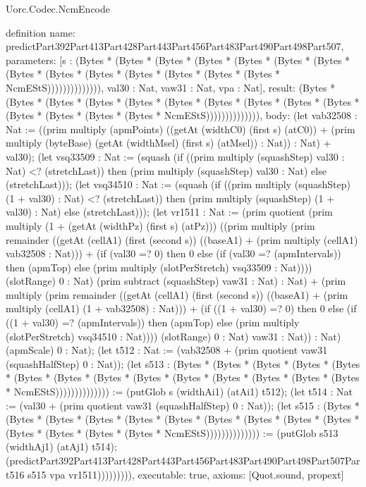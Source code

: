 \begin{lexlean}{Uorc.Codec.NcmEncode}
\begin{semanticmodule}
definition{
  name: predictPart392Part413Part428Part443Part456Part483Part490Part498Part507,
  parameters: [s : (Bytes * (Bytes * (Bytes * (Bytes * (Bytes * (Bytes * (Bytes * (Bytes * (Bytes * (Bytes * (Bytes * (Bytes * (Bytes * (Bytes * NcmEStS)))))))))))))), val30 : Nat, vaw31 : Nat, vpa : Nat],
  result: (Bytes * (Bytes * (Bytes * (Bytes * (Bytes * (Bytes * (Bytes * (Bytes * (Bytes * (Bytes * (Bytes * (Bytes * (Bytes * (Bytes * NcmEStS)))))))))))))),
  body: (let vab32508 : Nat := ((prim multiply (apmPoints) ((getAt (widthC0) (first s) (atC0)) + (prim multiply (byteBase) (getAt (widthMsel) (first s) (atMsel)) : Nat)) : Nat) + val30); (let vsq33509 : Nat := (squash (if ((prim multiply (squashStep) val30 : Nat) <? (stretchLast)) then (prim multiply (squashStep) val30 : Nat) else (stretchLast))); (let vsq34510 : Nat := (squash (if ((prim multiply (squashStep) (1 + val30) : Nat) <? (stretchLast)) then (prim multiply (squashStep) (1 + val30) : Nat) else (stretchLast))); (let vr1511 : Nat := (prim quotient (prim multiply (1 + (getAt (widthPz) (first s) (atPz))) ((prim multiply (prim remainder ((getAt (cellA1) (first (second s)) ((baseA1) + (prim multiply (cellA1) vab32508 : Nat))) + (if (val30 =? 0) then 0 else (if (val30 =? (apmIntervals)) then (apmTop) else (prim multiply (slotPerStretch) vsq33509 : Nat)))) (slotRange) 0 : Nat) (prim subtract (squashStep) vaw31 : Nat) : Nat) + (prim multiply (prim remainder ((getAt (cellA1) (first (second s)) ((baseA1) + (prim multiply (cellA1) (1 + vab32508) : Nat))) + (if ((1 + val30) =? 0) then 0 else (if ((1 + val30) =? (apmIntervals)) then (apmTop) else (prim multiply (slotPerStretch) vsq34510 : Nat)))) (slotRange) 0 : Nat) vaw31 : Nat)) : Nat) (apmScale) 0 : Nat); (let t512 : Nat := (vab32508 + (prim quotient vaw31 (squashHalfStep) 0 : Nat)); (let s513 : (Bytes * (Bytes * (Bytes * (Bytes * (Bytes * (Bytes * (Bytes * (Bytes * (Bytes * (Bytes * (Bytes * (Bytes * (Bytes * (Bytes * NcmEStS)))))))))))))) := (putGlob s (widthAi1) (atAi1) t512); (let t514 : Nat := (val30 + (prim quotient vaw31 (squashHalfStep) 0 : Nat)); (let s515 : (Bytes * (Bytes * (Bytes * (Bytes * (Bytes * (Bytes * (Bytes * (Bytes * (Bytes * (Bytes * (Bytes * (Bytes * (Bytes * (Bytes * NcmEStS)))))))))))))) := (putGlob s513 (widthAj1) (atAj1) t514); (predictPart392Part413Part428Part443Part456Part483Part490Part498Part507Part516 s515 vpa vr1511))))))))),
  executable: true,
  axioms: [Quot.sound, propext]
}


\end{semanticmodule}
\end{lexlean}
